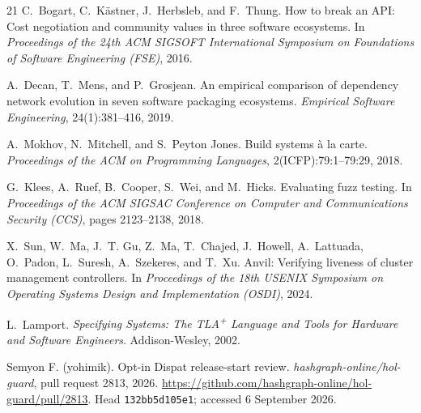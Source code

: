 \documentclass[sigconf,nonacm]{acmart}
\begin{document}
\begin{thebibliography}{21}
C.~Bogart, C.~K\"astner, J.~Herbsleb, and F.~Thung.
How to break an API: Cost negotiation and community values in three
software ecosystems.
In \emph{Proceedings of the 24th ACM SIGSOFT International Symposium on
Foundations of Software Engineering (FSE)}, 2016.

A.~Decan, T.~Mens, and P.~Grosjean.
An empirical comparison of dependency network evolution in seven
software packaging ecosystems.
\emph{Empirical Software Engineering}, 24(1):381--416, 2019.

A.~Mokhov, N.~Mitchell, and S.~Peyton Jones.
Build systems \`a la carte.
\emph{Proceedings of the ACM on Programming Languages},
2(ICFP):79:1--79:29, 2018.

G.~Klees, A.~Ruef, B.~Cooper, S.~Wei, and M.~Hicks.
Evaluating fuzz testing.
In \emph{Proceedings of the ACM SIGSAC Conference on Computer and
Communications Security (CCS)}, pages 2123--2138, 2018.

X.~Sun, W.~Ma, J.~T. Gu, Z.~Ma, T.~Chajed, J.~Howell, A.~Lattuada,
O.~Padon, L.~Suresh, A.~Szekeres, and T.~Xu.
Anvil: Verifying liveness of cluster management controllers.
In \emph{Proceedings of the 18th USENIX Symposium on Operating Systems
Design and Implementation (OSDI)}, 2024.

L.~Lamport.
\emph{Specifying Systems: The TLA\textsuperscript{+} Language and
Tools for Hardware and Software Engineers}.
Addison-Wesley, 2002.


Semyon F. (yohimik). Opt-in Dispat release-start review.
\emph{hashgraph-online/hol-guard}, pull request 2813, 2026.
\url{https://github.com/hashgraph-online/hol-guard/pull/2813}.
Head \texttt{132bb5d105e1}; accessed 6 September 2026.

\end{thebibliography}
\end{document}
